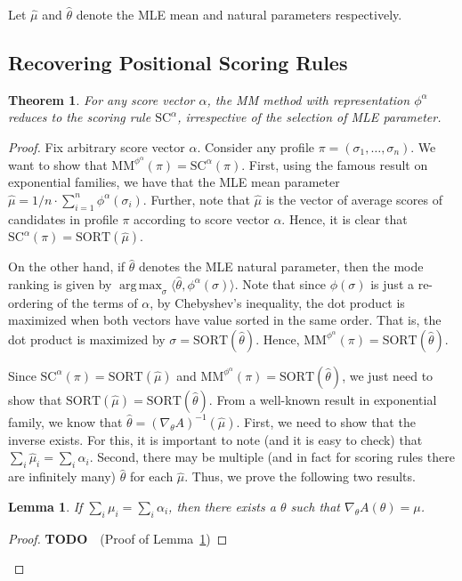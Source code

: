 \documentclass[10pt,letterpaper]{article}
\newtheorem{theorem}{Theorem}
\newtheorem{lemma}{Lemma}
\newcommand{\scr}{{\text{SC}}}
\newcommand{\mm}{\text{MM}}
\newcommand{\sca}{{\scr^{\alpha}}}
\newcommand{\sort}{\text{SORT}}
\newcommand{\phia}{\phi^{\alpha}}
\newcommand{\mmphia}{\mm^{\phia}}
\newcommand{\muhat}{\hat{\mu}}
\newcommand{\that}{\hat{\theta}}
\DeclareMathOperator*{\argmax}{arg\,max}
\newcommand{\grad}{\nabla}
\begin{document}
Let $\muhat$ and $\that$ denote the MLE mean and natural parameters respectively. 

\newpage
\subsection{Recovering Positional Scoring Rules}

\begin{theorem}
For any score vector $\alpha$, the MM method with representation $\phia$ reduces to the scoring rule $\sca$, irrespective of the selection of MLE parameter.
\label{thm:recover-scoring}
\end{theorem}
\begin{proof}
Fix arbitrary score vector $\alpha$. Consider any profile $\pi = (\sigma_1,\ldots,\sigma_n)$. We want to show that $\mmphia(\pi) = \sca(\pi)$. First, using the famous result on exponential families, we have that the MLE mean parameter $\muhat = 1/n \cdot \sum_{i=1}^n \phia(\sigma_i)$. Further, note that $\muhat$ is the vector of average scores of candidates in profile $\pi$ according to score vector $\alpha$. Hence, it is clear that $\sca(\pi) = \sort(\muhat)$.

On the other hand, if $\that$ denotes the MLE natural parameter, then the mode ranking is given by $\argmax_{\sigma} \langle \that, \phia(\sigma) \rangle$. Note that since $\phi(\sigma)$ is just a re-ordering of the terms of $\alpha$, by Chebyshev's inequality, the dot product is maximized when both vectors have value sorted in the same order. That is, the dot product is maximized by $\sigma = \sort(\that)$. Hence, $\mmphia(\pi) = \sort(\that)$. 

Since $\sca(\pi) = \sort(\muhat)$ and $\mmphia(\pi) = \sort(\that)$, we just need to show that $\sort(\muhat) = \sort(\that)$. From a well-known result in exponential family, we know that $\that =  (\grad_{\theta} A)^{-1} (\muhat)$. First, we need to show that the inverse exists. For this, it is important to note (and it is easy to check) that $\sum_i \muhat_i = \sum_i \alpha_i$. Second, there may be multiple (and in fact for scoring rules there are infinitely many) $\that$ for each $\muhat$. Thus, we prove the following two results.

\begin{lemma}
If $\sum_i \mu_i = \sum_i \alpha_i$, then there exists a $\theta$ such that $\grad_{\theta} A (\theta) = \mu$. 
\label{lem:scoring-existence}
\end{lemma}
\begin{proof}
{\bf TODO}~\qedhere~(Proof of Lemma~\ref{lem:scoring-existence})
\end{proof}


\end{proof}
\end{document}
